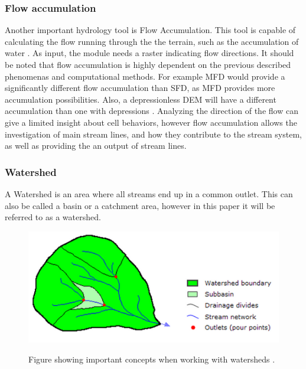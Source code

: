 \subsubsection{Flow accumulation}
Another important hydrology tool is Flow Accumulation. This tool is capable of calculating the flow running through the the terrain, such as the accumulation of water \citep{sfdmfd}. As input, the module needs a raster indicating flow directions. It should be noted that flow accumulation is highly dependent on the previous described phenomenas and computational methods. For example MFD would provide a significantly different flow accumulation than SFD, as MFD provides more accumulation possibilities. Also, a depressionless DEM will have a different accumulation than one with depressions \citep{sfdmfd}. Analyzing the direction of the flow can give a limited insight about cell behaviors, however flow accumulation allows the investigation of main stream lines, and how they contribute to the stream system, as well as providing the an output of stream lines.

\subsubsection{Watershed}
A Watershed is an area where all streams end up in a common outlet. This can also be called a basin or a catchment area, however in this paper it will be referred to as a watershed.\\


\begin{figure}[h]
\centering
	{\includegraphics[width=\linewidth]{gfx/Watershed.png}}
\caption{Figure showing important concepts when working with watersheds \citep{watershed}.}
\end{figure}

